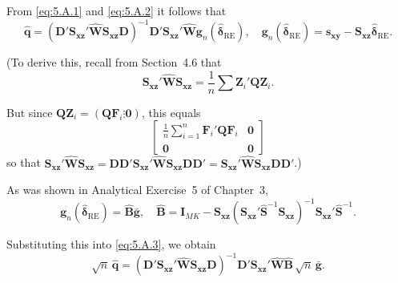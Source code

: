 From \eqref{eq:5.A.1} and \eqref{eq:5.A.2} it follows that
\begin{equation}
  \hat{\mathbf{q}} = (\mathbf{D}'\mathbf{S}_{\mathbf{xz}}'\hat{\mathbf{W}}\mathbf{S}_{\mathbf{xz}}\mathbf{D})^{-1}
  \mathbf{D}'\mathbf{S}_{\mathbf{xz}}'\hat{\mathbf{W}}\mathbf{g}_n(\hat{\boldsymbol{\delta}}_{\text{RE}}), \quad
  \mathbf{g}_n(\hat{\boldsymbol{\delta}}_{\text{RE}})
  = \mathbf{s}_{\mathbf{xy}} - \mathbf{S}_{\mathbf{xz}}\hat{\boldsymbol{\delta}}_{\text{RE}}.
  \label{eq:5.A.3} \tag{5.A.3}
\end{equation}

(To derive this, recall from Section~4.6 that
\[
  \mathbf{S}_{\mathbf{xz}}'\hat{\mathbf{W}}\mathbf{S}_{\mathbf{xz}}
  = \frac{1}{n}\sum \mathbf{Z}_i'\mathbf{Q}\mathbf{Z}_i.
\]

But since $\mathbf{Q}\mathbf{Z}_i = (\mathbf{Q}\mathbf{F}_i \vdots \mathbf{0})$, this equals
\begin{equation}
  \begin{bmatrix}
    \frac{1}{n}\sum_{i=1}^{n}\mathbf{F}_i'\mathbf{Q}\mathbf{F}_i & \mathbf{0} \\
    \mathbf{0} & \mathbf{0}
  \end{bmatrix}
  \label{eq:5.A.4} \tag{5.A.4}
\end{equation}
so that
$\mathbf{S}_{\mathbf{xz}}'\hat{\mathbf{W}}\mathbf{S}_{\mathbf{xz}}
= \mathbf{D}\mathbf{D}'\mathbf{S}_{\mathbf{xz}}'\hat{\mathbf{W}}\mathbf{S}_{\mathbf{xz}}\mathbf{D}\mathbf{D}'
= \mathbf{S}_{\mathbf{xz}}'\hat{\mathbf{W}}\mathbf{S}_{\mathbf{xz}}\mathbf{D}\mathbf{D}'$.)

As was shown in Analytical Exercise~5 of Chapter~3,
\begin{equation}
  \mathbf{g}_n(\hat{\boldsymbol{\delta}}_{\text{RE}}) = \hat{\mathbf{B}}\bar{\mathbf{g}}, \quad
  \hat{\mathbf{B}} = \mathbf{I}_{MK}
  - \mathbf{S}_{\mathbf{xz}}(\mathbf{S}_{\mathbf{xz}}'\hat{\mathbf{S}}^{-1}\mathbf{S}_{\mathbf{xz}})^{-1}
    \mathbf{S}_{\mathbf{xz}}'\hat{\mathbf{S}}^{-1}.
  \label{eq:5.A.5} \tag{5.A.5}
\end{equation}

Substituting this into \eqref{eq:5.A.3}, we obtain
\begin{equation}
  \sqrt{n}\,\hat{\mathbf{q}}
  = (\mathbf{D}'\mathbf{S}_{\mathbf{xz}}'\hat{\mathbf{W}}\mathbf{S}_{\mathbf{xz}}\mathbf{D})^{-1}
    \mathbf{D}'\mathbf{S}_{\mathbf{xz}}'\hat{\mathbf{W}}\hat{\mathbf{B}}\,\sqrt{n}\,\bar{\mathbf{g}}.
  \label{eq:5.A.6} \tag{5.A.6}
\end{equation}

